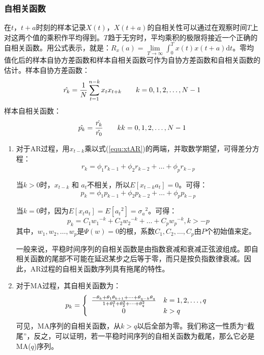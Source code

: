 \subsubsection{自相关函数}
在$t$，$t+a$时刻的样本记录$X(t)$，$X(t+a)$的自相关性可以通过在观察时间$T$上对这两个值的乘积作平均得到。$T$趋于无穷时，平均乘积的极限将接近一个正确的自相关函数。用公式表示，就是：$R_x(a) = \lim\limits_{T \rightarrow \infty} \int_{0}^{T}x(t)x(t+a)\mathrm{d}t$。零均值化后的样本自协方差函数和样本自相关函数可作为自协方差函数和自相关函数的估计。样本自协方差函数：
\begin{equation}
	\hat{r_k} = {1 \over N} \sum_{t=1}^{n-k}x_t x_{t+k}
	\qquad
	k = 0,1,2,\dots,N-1
\end{equation}
样本自相关函数：
\begin{equation}
	\hat{p_k} = {\hat{r_k} \over \hat{r_0}}
	\qquad
	kk = 0,1,2,\dots,N-1
\end{equation}
\begin{enumerate}[label=（\arabic*）]
	\item 对于AR过程，用$x_{t-k}$乘以式(\ref{equ:xtAR})的两端，并取数学期望，可得差分方程：
	\begin{equation}
		r_k = \phi_1 r_{k-1}+\phi_2 r_{k-2}+\dots+\phi_p r_{k-p}
	\end{equation}
	
	当$k>0$时，$x_{t-k}$ 和 $a_t$不相关，所以$E[x_{t-k} a_t] = 0$。可得：
	\begin{equation}
		p_k = \phi_1 p_{k-1}+\phi_2 p_{k-2}+\dots+\phi_p p_{k-p}
	\end{equation}
	
	当$k=0$时，因为$E[x_t a_t] = E[{a_t}^2] = {\sigma_a}^2$。可得：
	\begin{equation}
		p_k = C_1 {w_1}^{-k}+C_2 {w_2}^{-k}+\dots+C_p{w_p}^{-k},k>-p
	\end{equation}
	其中，$w_1,w_2,\dots,w_p$是$\Psi(w)=0$的根，系数$C_1,C_2,\dots,C_p$由$P$个初始值来定。
	
	一般来说，平稳时间序列的自相关函数是由指数衰减和衰减正弦波组成。即自相关函数的尾部不可能在延迟某步之后等于零，而只是按负指数律衰减。因此，AR过程的自相关函数序列具有拖尾的特性。
		
	\item 对于MA过程，其自相关函数为：
	\begin{equation}
		p_k = \left\lbrace 
		\begin{array}{cl}
		{-\theta_k+\theta_1\theta_{k+1}+\dots+\theta_{q-k}\theta_q\over {1+\theta_1^2+\theta_2^2+\dots+\theta_q^2}} &  k=1,2,\dots,q \\
		0 & k>q
		\end{array}
		 \right. 
	\end{equation}
	可见，MA序列的自相关函数，从$k>q$以后全部为零。我们称这一性质为“截尾”，反之，可以证明，若一平稳时间序列的自相关函数为截尾，那么它必是MA($q$)序列。
\end{enumerate}

